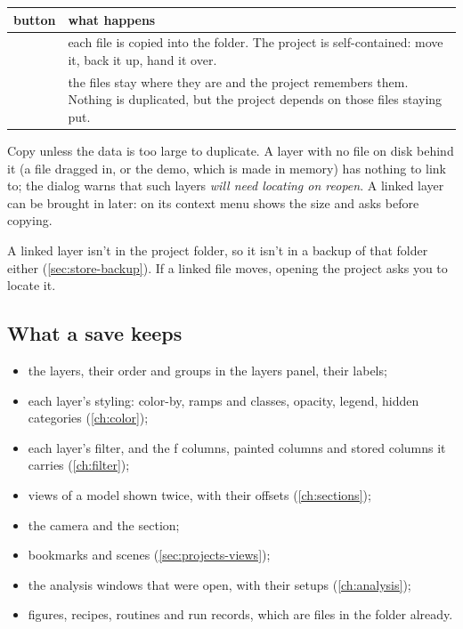 
\begin{tabularx}{\linewidth}{@{}lL@{}}\toprule
button & what happens \\ \midrule
{} & each file is copied into the folder. The project is self-contained: move it, back it up, hand it over. \\
 & the files stay where they are and the project remembers them. Nothing is duplicated, but the project depends on those files staying put. \\
\bottomrule
\end{tabularx}

Copy unless the data is too large to duplicate. A layer with no file on disk behind it (a file dragged in, or the demo, which is made in memory) has nothing to link to; the dialog warns that such layers \emph{will need locating on reopen}. A linked layer can be brought in later:  on its context menu shows the size and asks before copying.

\begin{caution}
A linked layer isn't in the project folder, so it isn't in a backup of that folder either (\cref{sec:store-backup}). If a linked file moves, opening the project asks you to locate it.
\end{caution}

\subsection{What a save keeps}
\begin{itemize}
\item the layers, their order and groups in the layers panel, their labels;
\item each layer's styling: color-by, ramps and classes, opacity, legend, hidden categories (\cref{ch:color});
\item each layer's filter, and the ƒ columns, painted columns and stored columns it carries (\cref{ch:filter});
\item views of a model shown twice, with their offsets (\cref{ch:sections});
\item the camera and the section;
\item bookmarks and scenes (\cref{sec:projects-views});
\item the analysis windows that were open, with their setups (\cref{ch:analysis});
\item figures, recipes, routines and run records, which are files in the folder already.
\end{itemize}

